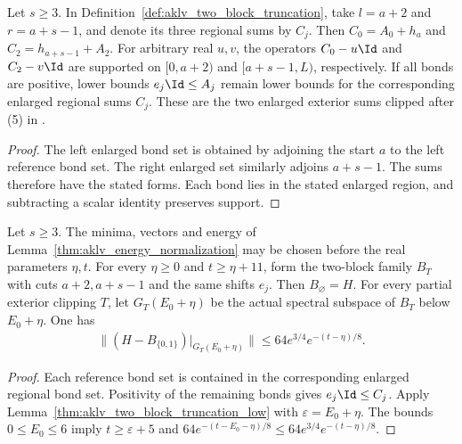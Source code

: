 \begin{lemma}
    \label{thm:aklv_two_block_exterior_data}
    \leanok
    Let $s\ge3$. In Definition~\ref{def:aklv_two_block_truncation}, take
    $l=a+2$ and $r=a+s-1$, and denote its three regional sums by $C_j$.
    Then $C_0=A_0+h_a$ and $C_2=h_{a+s-1}+A_2$.
    For arbitrary real $u,v$, the operators $C_0-u\Id$ and $C_2-v\Id$
    are supported on $[0,a+2)$ and ${[a+s-1,L)}$, respectively.
    If all bonds are positive, lower bounds $e_j\Id\le A_j$ remain
    lower bounds for the corresponding enlarged regional sums $C_j$.
    These are the two enlarged exterior sums clipped after (5) in
    \cite[Section~6.1]{Arad2013AreaLaw}.
\end{lemma}
\begin{proof}
    \leanok
    The left enlarged bond set is obtained by adjoining the start $a$ to the
    left reference bond set. The right enlarged set similarly adjoins
    $a+s-1$. The sums therefore have the stated forms. Each bond lies in
    the stated enlarged region, and subtracting a scalar identity preserves support.
\end{proof}

\begin{lemma}
    \label{thm:aklv_normalized_two_block_residual}
    \leanok
    Let $s\ge3$. The minima, vectors and energy of
    Lemma~\ref{thm:aklv_energy_normalization} may be chosen before the real
    parameters $\eta,t$.
    For every $\eta\ge0$ and $t\ge\eta+11$, form the two-block family $B_T$
    with cuts $a+2,a+s-1$ and the same shifts $e_j$.
    Then $B_\varnothing=H$. For every partial exterior clipping $T$, let
    $G_T(E_0+\eta)$ be the actual spectral subspace of $B_T$ below $E_0+\eta$.
    One has
    \begin{align}
        \bigl\|(H-B_{\{0,1\}})|_{G_T(E_0+\eta)}\bigr\|
        \le64e^{3/4}e^{-(t-\eta)/8}.
        \label{eq:aklv_normalized_residual}
    \end{align}
\end{lemma}
\begin{proof}
    \leanok
    Each reference bond set is contained in the corresponding enlarged
    regional bond set. Positivity of the remaining bonds gives
    $e_j\Id\le C_j$. Apply Lemma~\ref{thm:aklv_two_block_truncation_low}
    with $\varepsilon=E_0+\eta$. The bounds $0\le E_0\le6$ imply
    $t\ge\varepsilon+5$ and
    $64e^{-(t-E_0-\eta)/8}\le64e^{3/4}e^{-(t-\eta)/8}$.
\end{proof}

